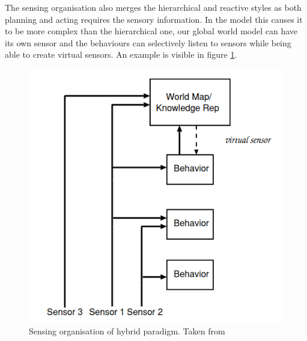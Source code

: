 \documentclass{article}
\newcommand\tab[1][1cm]{\hspace*{#1}}
\begin{document}
\tab The sensing organisation also merges the hierarchical and reactive styles as both planning and
acting requires the sensory
information. In the model this causes it to be more complex than the hierarchical one, our global world model can have its
own sensor and the behaviours can selectively listen to sensors while being able to create virtual sensors.
An example is visible in figure \ref{sOrg}.
\begin{figure}[ht]
    \centering
    \includegraphics[scale=0.5]{img/sensing-organisation.png}
    \caption{Sensing organisation of hybrid paradigm. Taken from \cite{IntroToAI}}
    \label{sOrg}
\end{figure}
\newpage
\end{document}
